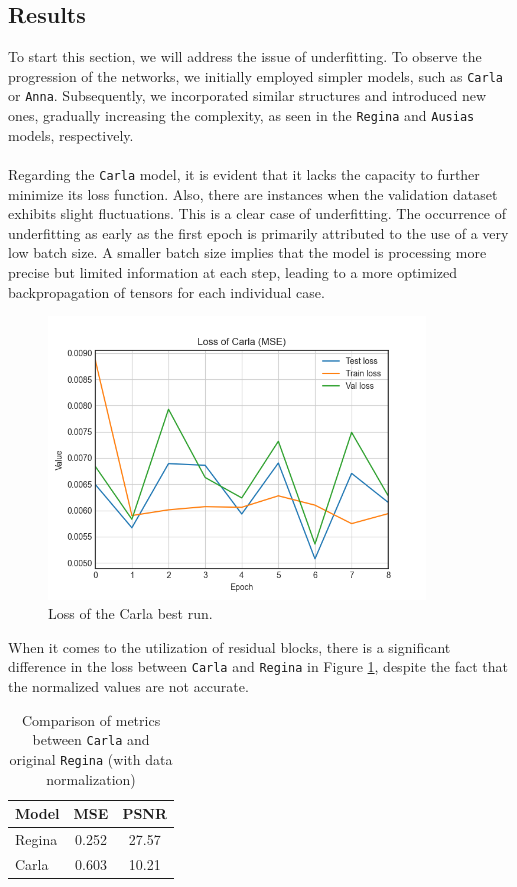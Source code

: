 \subsection{Results}
To start this section, we will address the issue of underfitting. To observe the progression of the networks, we initially employed simpler models, such as \texttt{Carla} or \texttt{Anna}. Subsequently, we incorporated similar structures and introduced new ones, gradually increasing the complexity, as seen in the \texttt{Regina} and \texttt{Ausias} models, respectively.
\\
\\
Regarding the \texttt{Carla} model, it is evident that it lacks the capacity to further minimize its loss function. Also, there are instances when the validation dataset exhibits slight fluctuations. This is a clear case of underfitting. The occurrence of underfitting as early as the first epoch is primarily attributed to the use of a very low batch size. A smaller batch size implies that the model is processing more precise but limited information at each step, leading to a more optimized backpropagation of tensors for each individual case.
\begin{figure}[H]
	\centering
	\includegraphics[width=10cm]{imgs/models/models/cnn/loss.png}
	\caption{Loss of the Carla best run.}
	\label{fig:models-carla-loss}
\end{figure}
When it comes to the utilization of residual blocks, there is a significant difference in the loss between \texttt{Carla} and \texttt{Regina} in Figure \ref{tab:models-metrics-cnn}, despite the fact that the normalized values are not accurate.
\begin{table}[H]
	\caption{Comparison of metrics between \texttt{Carla} and original \texttt{Regina} (with data normalization)}
	\centering
	\begin{tabular}{lcc}
		Model  &  MSE  & PSNR  \\ \hline
		Regina & 0.252 & 27.57 \\
		Carla  & 0.603 & 10.21
	\end{tabular}
	\label{tab:models-metrics-cnn}
\end{table}
